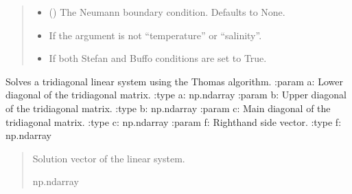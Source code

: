 \documentclass[a4paper,11pt,english,openany]{sphinxmanual}
\begin{document}
\begin{fulllineitems}
\begin{quote}
\begin{description}
\begin{itemize}
\item {} 
\sphinxAtStartPar
{} (\sphinxstyleliteralemphasis{\sphinxupquote{, }}) \textendash{} The Neumann boundary condition. Defaults to None.

\end{itemize}

\begin{itemize}
\item {} 
\sphinxAtStartPar
{} \textendash{} If the argument is not “temperature” or “salinity”.

\item {} 
\sphinxAtStartPar
{} \textendash{} If both Stefan and Buffo conditions are set to True.

\end{itemize}

\end{description}\end{quote}

\begin{fulllineitems}
\label{\detokenize{api/spyice.models.advection_diffusion:src.spyice.models.advection_diffusion.AdvectionDiffusion.Buffosolver}}
\pysigstartsignatures
\pysiglinewithargsret
{}
{\sphinxparamcomma {}\sphinxparamcomma {}\sphinxparamcomma {}}
{}
\pysigstopsignatures
\sphinxAtStartPar
Solves a tridiagonal linear system using the Thomas algorithm.
:param a: Lower diagonal of the tridiagonal matrix.
:type a: np.ndarray
:param b: Upper diagonal of the tridiagonal matrix.
:type b: np.ndarray
:param c: Main diagonal of the tridiagonal matrix.
:type c: np.ndarray
:param f: Right\sphinxhyphen{}hand side vector.
:type f: np.ndarray
\begin{quote}\begin{description}
\sphinxAtStartPar
Solution vector of the linear system.

\sphinxAtStartPar
np.ndarray


\end{description}
\end{quote}
\end{fulllineitems}
\end{fulllineitems}
\end{document}
